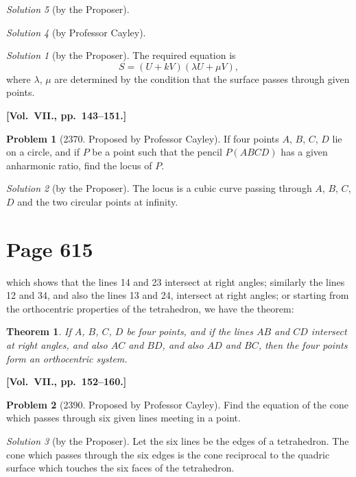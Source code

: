 \documentclass[12pt,a4paper]{article}
\theoremstyle{plain}
\newtheorem{theorem}{Theorem}
\theoremstyle{definition}
\newtheorem{problem}{Problem}
\theoremstyle{remark}
\newtheorem*{solution}{Solution}
\begin{document}
\begin{solution}[by the Proposer]
\begin{solution}[by Professor Cayley]
\begin{solution}[by the Proposer]
The required equation is
\[
S = (U + kV)(\lambda U + \mu V),
\]
where $\lambda$, $\mu$ are determined by the condition that the surface passes through given points.
\end{solution}

\medskip\noindent\textbf{[Vol.~VII., pp.~143--151.]}

\begin{problem}[2370. Proposed by Professor Cayley]
If four points $A$, $B$, $C$, $D$ lie on a circle, and if $P$ be a point such that the pencil $P(ABCD)$ has a given anharmonic ratio, find the locus of $P$.
\end{problem}

\begin{solution}[by the Proposer]
The locus is a cubic curve passing through $A$, $B$, $C$, $D$ and the two circular points at infinity.
\end{solution}

\section*{Page 615}
\setcounter{page}{615}

which shows that the lines 14 and 23 intersect at right angles; similarly the lines 12 and 34, and also the lines 13 and 24, intersect at right angles; or starting from the orthocentric properties of the tetrahedron, we have the theorem:

\begin{theorem}
If $A$, $B$, $C$, $D$ be four points, and if the lines $AB$ and $CD$ intersect at right angles, and also $AC$ and $BD$, and also $AD$ and $BC$, then the four points form an orthocentric system.
\end{theorem}

\medskip\noindent\textbf{[Vol.~VII., pp.~152--160.]}

\begin{problem}[2390. Proposed by Professor Cayley]
Find the equation of the cone which passes through six given lines meeting in a point.
\end{problem}

\begin{solution}[by the Proposer]
Let the six lines be the edges of a tetrahedron. The cone which passes through the six edges is the cone reciprocal to the quadric surface which touches the six faces of the tetrahedron.
\end{solution}


\end{solution}
\end{solution}
\end{document}
